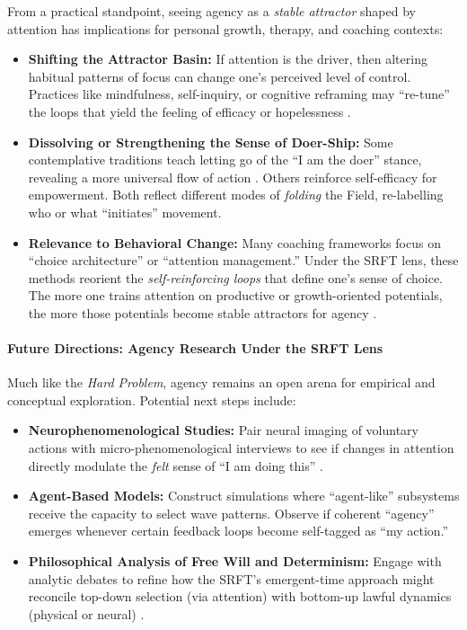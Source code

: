\documentclass[12pt,a4paper]{article}
\begin{document}
From a practical standpoint, seeing agency as a \emph{stable attractor} shaped by
attention has implications for personal growth, therapy, and coaching contexts:
\begin{itemize}
    \item \textbf{Shifting the Attractor Basin:} If attention is the driver, then
    altering habitual patterns of focus can change one’s perceived level of control.
    Practices like mindfulness, self-inquiry, or cognitive reframing may “re-tune” the
    loops that yield the feeling of efficacy or hopelessness
    \cite{shapiro2006mindfulness}.

    \item \textbf{Dissolving or Strengthening the Sense of Doer-Ship:} Some contemplative
    traditions teach letting go of the “I am the doer” stance, revealing a more
    universal flow of action \cite{ramacandra1923upanishads}. Others reinforce self-efficacy
    for empowerment. Both reflect different modes of \emph{folding} the Field,
    re-labelling who or what “initiates” movement.

    \item \textbf{Relevance to Behavioral Change:} Many coaching frameworks focus on
    “choice architecture” or “attention management.” Under the SRFT lens, these methods
    reorient the \emph{self-reinforcing loops} that define one’s sense of choice. The
    more one trains attention on productive or growth-oriented potentials, the more
    those potentials become stable attractors for agency
    \cite{baumeister2008freewill}.
\end{itemize}

\paragraph{Future Directions: Agency Research Under the SRFT Lens}
\label{subsec:agency-future-work}

Much like the \emph{Hard Problem}, agency remains an open arena for empirical and
conceptual exploration. Potential next steps include:
\begin{itemize}
    \item \textbf{Neurophenomenological Studies:} Pair neural imaging of voluntary actions
    with micro-phenomenological interviews to see if changes in attention directly
    modulate the \emph{felt} sense of “I am doing this” \cite{petitmengin2006}.
    \item \textbf{Agent-Based Models:} Construct simulations where “agent-like” subsystems
    receive the capacity to select wave patterns. Observe if coherent “agency” emerges
    whenever certain feedback loops become self-tagged as “my action.”
    \item \textbf{Philosophical Analysis of Free Will and Determinism:} Engage with
    analytic debates to refine how the SRFT’s emergent-time approach might reconcile
    top-down selection (via attention) with bottom-up lawful dynamics (physical or
    neural) \cite{shoemaker2003agency,whitehead1929process}.
\end{itemize}
\end{document}
